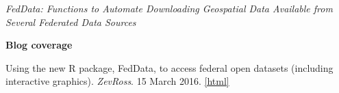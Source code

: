 \emph{FedData: Functions to Automate Downloading Geospatial Data Available from Several Federated Data Sources}
\nopagebreak
\begin{list1}
\item[] {\bf Blog coverage}
\begin{list2}
\item[-] Using the new R package, FedData, to access federal open datasets (including interactive graphics). \emph{ZevRoss}. 15 March 2016. \href{https://zevross.com/blog/2016/03/15/using-the-new-r-package-feddata-to-access-federal-open-datasets-including-interactive-graphics/}{[html]}
\end{list2}

\end{list1}


